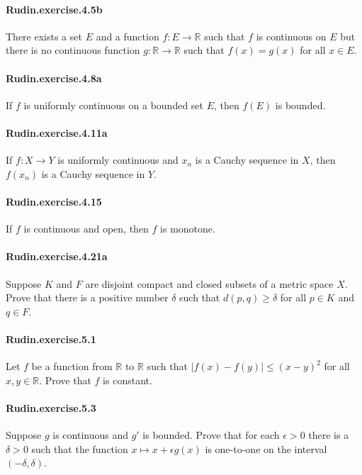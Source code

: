 \documentclass{article}
\begin{document}
\paragraph{Rudin.exercise.4.5b} There exists a set $E$ and a function $f:E\to\mathbb{R}$ such that $f$ is continuous on $E$ but there is no continuous function $g:\mathbb{R}\to\mathbb{R}$ such that $f(x)=g(x)$ for all $x\in E$.

\paragraph{Rudin.exercise.4.8a} If $f$ is uniformly continuous on a bounded set $E$, then $f(E)$ is bounded.

\paragraph{Rudin.exercise.4.11a} If $f:X\to Y$ is uniformly continuous and $x_n$ is a Cauchy sequence in $X$, then $f(x_n)$ is a Cauchy sequence in $Y$.

\paragraph{Rudin.exercise.4.15} If $f$ is continuous and open, then $f$ is monotone.

\paragraph{Rudin.exercise.4.21a} Suppose $K$ and $F$ are disjoint compact and closed subsets of a metric space $X$. Prove that there is a positive number $\delta$ such that $d(p,q)\geq \delta$ for all $p\in K$ and $q\in F$.

\paragraph{Rudin.exercise.5.1} Let $f$ be a function from $\mathbb{R}$ to $\mathbb{R}$ such that $|f(x)-f(y)|\leq (x-y)^2$ for all $x, y \in \mathbb{R}$. Prove that $f$ is constant.

\paragraph{Rudin.exercise.5.3} Suppose $g$ is continuous and $g'$ is bounded. Prove that for each $\epsilon>0$ there is a $\delta>0$ such that the function $x\mapsto x+\epsilon g(x)$ is one-to-one on the interval $(-\delta, \delta)$.
\end{document}
